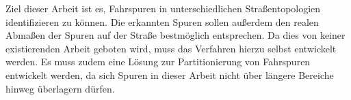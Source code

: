 Ziel dieser Arbeit ist es, Fahrspuren in unterschiedlichen Straßentopologien identifizieren zu können.
Die erkannten Spuren sollen außerdem den realen Abmaßen der Spuren auf der Straße bestmöglich entsprechen.
Da dies von keiner existierenden Arbeit geboten wird, muss das Verfahren hierzu selbst entwickelt werden.
Es muss zudem eine Lösung zur Partitionierung von Fahrspuren entwickelt werden, da sich Spuren
in dieser Arbeit nicht über längere Bereiche hinweg überlagern dürfen.


